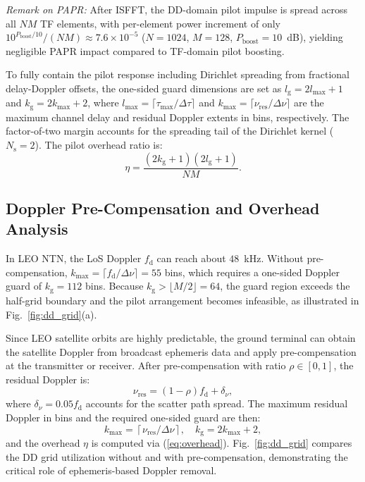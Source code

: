 ﻿\documentclass[conference]{IEEEtran}
\begin{document}
\textit{Remark on PAPR:} After ISFFT, the DD-domain pilot impulse is spread across all $NM$ TF elements, with per-element power increment of only $10^{P_{\mathrm{boost}}/10}/(NM) \approx 7.6 \times 10^{-5}$ ($N\!=\!1024$, $M\!=\!128$, $P_{\mathrm{boost}}\!=\!10$~dB), yielding negligible PAPR impact compared to TF-domain pilot boosting.

To fully contain the pilot response including Dirichlet spreading from fractional delay-Doppler offsets, the one-sided guard dimensions are set as $l_{\mathrm{g}} = 2l_{\max}+1$ and $k_{\mathrm{g}} = 2k_{\max}+2$, where $l_{\max} = \lceil \tau_{\max}/\Delta\tau \rceil$ and $k_{\max} = \lceil \nu_{\mathrm{res}}/\Delta\nu \rceil$ are the maximum channel delay and residual Doppler extents in bins, respectively. The factor-of-two margin accounts for the spreading tail of the Dirichlet kernel ($N_{\mathrm{s}} = 2$). The pilot overhead ratio is:
\begin{equation}\label{eq:overhead}
  \eta = \frac{(2k_{\mathrm{g}}+1)(2l_{\mathrm{g}}+1)}{NM}.
\end{equation}

\subsection{Doppler Pre-Compensation and Overhead Analysis}

In LEO NTN, the LoS Doppler $f_{\mathrm{d}}$ can reach about $48$~kHz. Without pre-compensation, $k_{\max} = \lceil f_{\mathrm{d}} / \Delta\nu \rceil = 55$ bins, which requires a one-sided Doppler guard of $k_{\mathrm{g}} = 112$ bins. Because $k_{\mathrm{g}} > \lfloor M/2 \rfloor = 64$, the guard region exceeds the half-grid boundary and the pilot arrangement becomes infeasible, as illustrated in Fig.~\ref{fig:dd_grid}(a).

Since LEO satellite orbits are highly predictable, the ground terminal can obtain the satellite Doppler from broadcast ephemeris data and apply pre-compensation at the transmitter or receiver. After pre-compensation with ratio $\rho \in [0, 1]$, the residual Doppler is:
\begin{equation}\label{eq:residual_doppler}
  \nu_{\mathrm{res}} = (1 - \rho) f_{\mathrm{d}} + \delta_\nu,
\end{equation}
where $\delta_\nu = 0.05 f_{\mathrm{d}}$ accounts for the scatter path spread. The maximum residual Doppler in bins and the required one-sided guard are then:
\begin{equation}\label{eq:kguard}
  k_{\max} = \left\lceil \nu_{\mathrm{res}} / \Delta\nu \right\rceil, \quad
  k_{\mathrm{g}} = 2 k_{\max} + 2,
\end{equation}
and the overhead $\eta$ is computed via (\ref{eq:overhead}). Fig.~\ref{fig:dd_grid} compares the DD grid utilization without and with pre-compensation, demonstrating the critical role of ephemeris-based Doppler removal.
\end{document}
